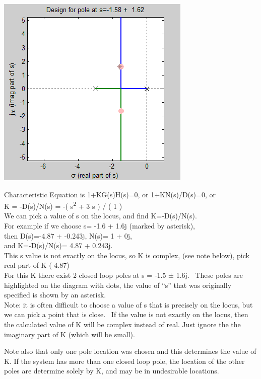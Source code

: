 \documentclass[16pt]{article}
\begin{document}
\includegraphics{./Root Locus_ Example 1_files/RLFindGain.png}

Characteristic Equation is 1+KG(s)H(s)=0, or 1+KN(s)/D(s)=0, or\\
K = -D(s)/N(s) = -( s\textsuperscript{2} + 3 s ) / ( 1 )\\
We can pick a value of s on the locus, and find
K=-D(s)/N(s).\\[2\baselineskip]For example if we choose s= -1.6 + 1.6j
(marked by asterisk),\\
then D(s)=-4.87 + -0.243j, N(s)= 1 + 0j,\\
and K=-D(s)/N(s)= 4.87 + 0.243j.\\
This s value is not exactly on the locus, so K is complex, (see note
below), pick real part of K ( 4.87)\\[2\baselineskip]For this K there
exist 2 closed loop poles at s = -1.5 ± 1.6j.~ These poles are
highlighted on the diagram with dots, the value of ``s'' that was
originally specified is shown by an asterisk.\\[2\baselineskip]Note: it
is often difficult to choose a value of s that is precisely on the
locus, but we can pick a point that is close.~ If the value is not
exactly on the locus, then the calculated value of K will be complex
instead of real. Just ignore the the imaginary part of K (which will be
small).~

Note also that only one pole location was chosen and this determines the
value of K. If the system has more than one closed loop pole, the
location of the other poles are determine solely by K, and may be in
undesirable locations.
\end{document}
